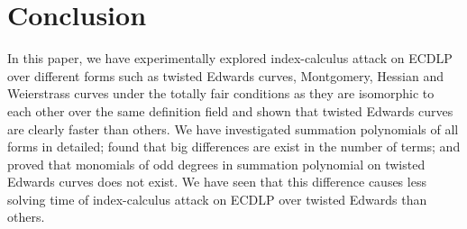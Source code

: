 \section{Conclusion}
\label{sec:conclusion}

%
In this paper, we have experimentally explored index-calculus attack
on ECDLP over different forms such as twisted Edwards curves,
Montgomery, Hessian and Weierstrass curves under the totally fair
conditions as they are isomorphic to each other over the same
definition field  and shown that twisted Edwards curves are
clearly faster than others.
%
We have investigated summation polynomials of all forms in detailed;
found that big differences are exist in the number of terms; and
proved that monomials of odd degrees in summation polynomial on
twisted Edwards curves does not exist.
%
We have seen that this difference causes less solving time of
index-calculus attack on ECDLP over twisted Edwards than others.
%

